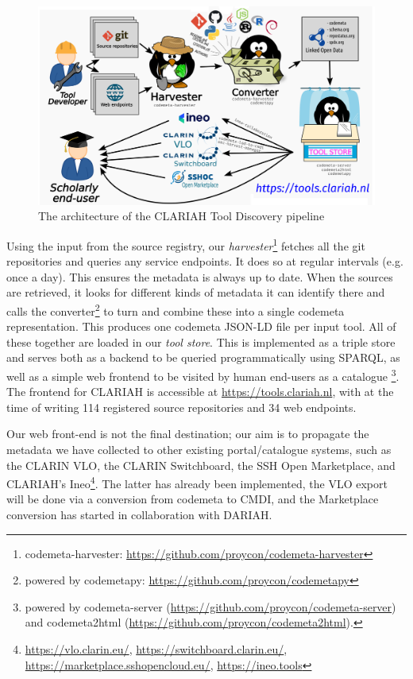 \documentclass[a4paper,11pt]{article}
\begin{document}
\begin{figure}[h]
\begin{center}
\includegraphics[width=14.0cm]{architecture.png}
\caption{The architecture of the CLARIAH Tool Discovery pipeline}
\end{center}
\label{fig:architecture}
\end{figure}

Using the input from the source registry, our
\emph{harvester}\footnote{codemeta-harvester:
\url{https://github.com/proycon/codemeta-harvester}} fetches all the git
repositories and queries any service endpoints. It does so at regular intervals
(e.g. once a day). This ensures the metadata is always up to date. When the
sources are retrieved, it looks for different kinds of metadata it can identify
there and calls the converter\footnote{powered by codemetapy:
\url{https://github.com/proycon/codemetapy}} to turn and combine these into a
single codemeta representation. This produces one codemeta JSON-LD file per
input tool. All of these together are loaded in our \emph{tool store}. This is
implemented as a triple store and serves both as a backend to be queried
programmatically using SPARQL, as well as a simple web frontend to be visited
by human end-users as a catalogue \footnote{powered by codemeta-server
(\url{https://github.com/proycon/codemeta-server}) and codemeta2html
(\url{https://github.com/proycon/codemeta2html}).}. The frontend for CLARIAH is
accessible at \url{https://tools.clariah.nl}, with at the time of writing
114 registered source repositories and 34 web endpoints.

Our web front-end is not the final destination; our aim is to propagate the
metadata we have collected to other existing portal/catalogue systems, such as
the CLARIN VLO, the CLARIN Switchboard, the SSH Open Marketplace, and CLARIAH's
Ineo\footnote{\url{https://vlo.clarin.eu/},
\url{https://switchboard.clarin.eu/},
\url{https://marketplace.sshopencloud.eu/}, \url{https://ineo.tools}}. The
latter has already been implemented, the VLO export will be done via a conversion
from codemeta to CMDI, and the Marketplace conversion has started in collaboration with
DARIAH.
\end{document}
